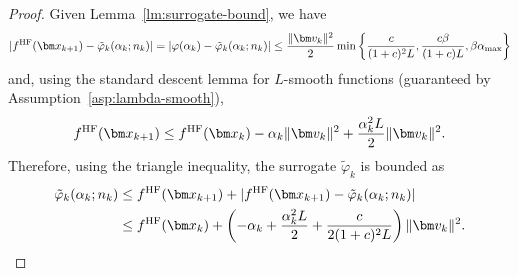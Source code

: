 \documentclass[10pt]{article} %
\numberwithin{equation}{section}
\theoremstyle{plain}
\theoremstyle{definition}
\newcommand{\<}{\langle}
\renewcommand{\>}{\rangle}
\renewcommand{\(}{\left(}
\renewcommand{\)}{\right)}
\renewcommand{\[}{\left[}
\renewcommand{\]}{\right]}
\newcommand{\HF}{\textup{HF}}
\newcommand{\alphaMax}{\alpha_\textup{max}}
\newcommand{\Lip}{L}
\newcommand{\HFSurrogate}{\tilde{\varphi}_k}
\begin{document}
\begin{proof}

    Given Lemma~\ref{lm:surrogate-bound}, 
    we have
    \begin{equation}
        \lvert f^\HF(\bm x_{k+1}) - \HFSurrogate(\alpha_k; n_k)\rvert = \lvert\varphi(\alpha_k) - \HFSurrogate(\alpha_k; n_k)\rvert \leq \frac{\lVert \bm v_k\rVert^2}{2} \min\left\{\frac{c}{(1+c)^2\Lip}, \frac{c\beta}{(1+c)\Lip}, \beta \alphaMax\right\}
    \end{equation}
    and, using the standard descent lemma for $L$-smooth functions (guaranteed by Assumption~\ref{asp:lambda-smooth}), 
    \begin{equation}
        f^\HF(\bm x_{k+1}) \leq f^\HF(\bm x_k) - \alpha_k\lVert \bm v_k\rVert^2 + \frac{\alpha_k^2\Lip}{2}\lVert \bm v_k\rVert^2.
    \end{equation}
    Therefore, using the triangle inequality, the surrogate $\HFSurrogate$ is bounded as
    \begin{align*}
        \HFSurrogate(\alpha_k; n_k) 
        &\leq f^\HF(\bm x_{k+1}) + \lvert f^\HF(\bm x_{k+1}) - \HFSurrogate(\alpha_k; n_k)\rvert \\
        &\leq f^\HF(\bm x_k) + \left(-\alpha_k + \frac{\alpha_k^2\Lip}{2} + \frac{c}{2(1+c)^2\Lip}\right)\lVert \bm v_k \rVert^2.
    \end{align*}

    

\end{proof}
\end{document}

